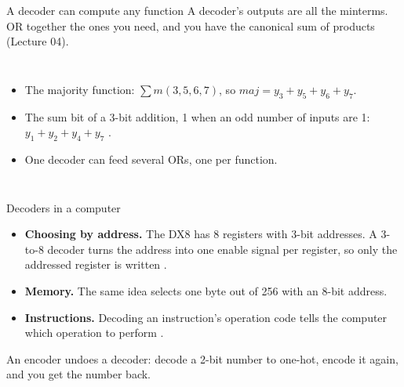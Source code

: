 \documentclass[10pt]{wosm-slides}
\begin{document}
\begin{frame}{A decoder can compute any function}
  A decoder's outputs are all the minterms. OR together the ones you need, and you
  have the canonical sum of products (Lecture 04).

  \medskip
  \begin{columns}[c, totalwidth=\textwidth]
      \centering
      \begin{itemize}
        \item The majority function: $\sum m(3, 5, 6, 7)$, so
          $\mathit{maj} = y_3 + y_5 + y_6 + y_7$.
        \item The sum bit of a 3-bit addition, 1 when an odd number of inputs are 1:
          $y_1 + y_2 + y_4 + y_7$ .
        \item One decoder can feed several ORs, one per function.
      \end{itemize}
  \end{columns}
\end{frame}

\begin{frame}{Decoders in a computer}
  \begin{itemize}
    \item \textbf{Choosing by address.} The DX8 has 8 registers with 3-bit
      addresses. A 3-to-8 decoder turns the address into one enable signal per
      register, so only the addressed register is written .
    \item \textbf{Memory.} The same idea selects one byte out of 256 with an 8-bit
      address.
    \item \textbf{Instructions.} Decoding an instruction's operation code tells the
      computer which operation to perform .
  \end{itemize}

  \bigskip
  \begin{remark}
    An encoder undoes a decoder: decode a 2-bit number to one-hot, encode it again,
    and you get the number back.
  \end{remark}
\end{frame}
\end{document}
